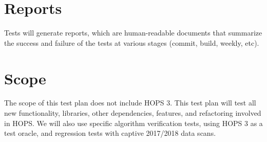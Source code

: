 \documentclass[notitlepage,letterpaper,pdftex,12pt,final]{article}
\numberwithin{equation}{section}
\begin{document}
\section{Reports}
\label{sec:reports}
Tests will generate reports, which are human-readable documents that 
summarize the success and failure of the tests at various stages
(commit, build, weekly, etc). 


\section{Scope}
\label{sec:scope}
The scope of this test plan does not include \ac{HOPS} 3. This test plan will test
all new functionality, libraries, other dependencies, features, and refactoring involved in
\ac{HOPS}. We will also use specific algorithm verification tests, using \ac{HOPS} 3 as a test
oracle, and regression tests with captive 2017/2018 data scans.



















\addtocounter{section}{1}
\renewcommand{\refname}{\thesection. References}
\printbibliography
\label{sec:references}


\label{page:LastPage}
\end{document}
